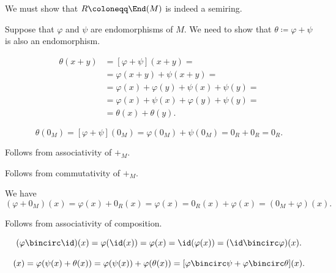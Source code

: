 \begin{defproof}
  We must show that \( R \coloneqq \End(M) \) is indeed a semiring.

   Suppose that \( \varphi \) and \( \psi \) are endomorphisms of \( M \). We need to show that \( \theta \coloneqq \varphi + \psi \) is also an endomorphism.

  \begin{align*}
    \theta(x + y)
    &=
    [\varphi + \psi](x + y)
    = \\ &=
    \varphi(x + y) + \psi(x + y)
    = \\ &=
    \varphi(x) + \varphi(y) + \psi(x) + \psi(y)
    = \\ &=
    \varphi(x) + \psi(x) + \varphi(y) + \psi(y)
    = \\ &=
    \theta(x) + \theta(y).
  \end{align*}

  \begin{equation*}
    \theta(0_M)
    =
    [\varphi + \psi](0_M)
    =
    \varphi(0_M) + \psi(0_M)
    =
    0_R + 0_R
    =
    0_R.
  \end{equation*}

   Follows from associativity of \( {+_M} \).

   Follows from commutativity of \( {+_M} \).

   We have
  \begin{equation*}
    (\varphi + 0_M)(x)
    =
    \varphi(x) + 0_R(x)
    =
    \varphi(x)
    =
    0_R(x) + \varphi(x)
    =
    (0_M + \varphi)(x).
  \end{equation*}

   Follows from associativity of composition.

  \begin{equation*}
    (\varphi \bincirc \id)(x)
    =
    \varphi(\id(x))
    =
    \varphi(x)
    =
    \id(\varphi(x))
    =
    (\id \bincirc \varphi)(x).
  \end{equation*}

  \begin{equation*}
    [\varphi \bincirc (\psi + \theta)](x)
    =
    \varphi(\psi(x) + \theta(x))
    =
    \varphi(\psi(x)) + \varphi(\theta(x))
    =
    [\varphi \bincirc \psi + \varphi \bincirc \theta](x).
  \end{equation*}


\end{defproof}
